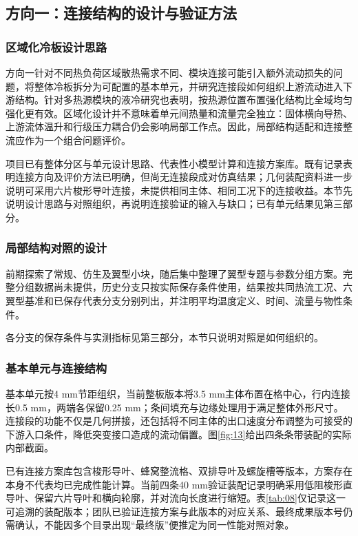 \documentclass[UTF8]{midterm}
\begin{document}
\subsection{方向一：连接结构的设计与验证方法}
\label{ch:connection}
\subsubsection{区域化冷板设计思路}
方向一针对不同热负荷区域散热需求不同、模块连接可能引入额外流动损失的问题，将整体冷板拆分为可配置的基本单元，并研究连接段如何组织上游流动进入下游结构。针对多热源模块的液冷研究也表明，按热源位置布置强化结构比全域均匀强化更有效\cite{ref2}。区域化设计并不意味着单元间热量和流量完全独立：固体横向导热、上游流体温升和行级压力耦合仍会影响局部工作点。因此，局部结构适配和连接整流应作为一个组合问题评价。

项目已有整体分区与单元设计思路、代表性小模型计算和连接方案库。既有记录表明连接方向及评价方法已明确，但尚无连接段成对仿真结果；几何装配资料进一步说明可采用六片梭形导叶连接，未提供相同主体、相同工况下的连接收益。本节先说明设计思路与对照组织，再说明连接验证的输入与缺口；已有单元结果见第三部分。

\subsubsection{局部结构对照的设计}
前期探索了常规、仿生及翼型小块，随后集中整理了翼型专题与参数分组方案。完整分组数据尚未提供，历史分支只按实际保存条件使用，结果按共同热流工况、六翼型基准和已保存代表分支分别列出，并注明平均温度定义、时间、流量与物性条件\cite{stagereports}。

各分支的保存条件与实测指标见第三部分，本节只说明对照是如何组织的。

\subsubsection{基本单元与连接结构}
基本单元按4 mm节距组织，当前整板版本将3.5 mm主体布置在格中心，行内连接长0.5 mm，两端各保留0.25 mm；条间填充与边缘处理用于满足整体外形尺寸。连接段的功能不仅是几何拼接，还包括将不同主体的出口速度分布调整为可接受的下游入口条件，降低突变接口造成的流动偏置。图\ref{fig:13}给出四条条带装配的实际内部截面。

已有连接方案库包含梭形导叶、蜂窝整流格、双排导叶及螺旋槽等版本，方案存在本身不代表均已完成性能计算。当前四条40 mm验证装配记录明确采用低阻梭形直导叶、保留六片导叶和横向轮廓，并对流向长度进行缩短。表\ref{tab:08}仅记录这一可追溯的装配版本；团队已验证连接方案与此版本的对应关系、最终成果版本号仍需确认，不能因多个目录出现“最终版”便推定为同一性能对照对象。
\end{document}
